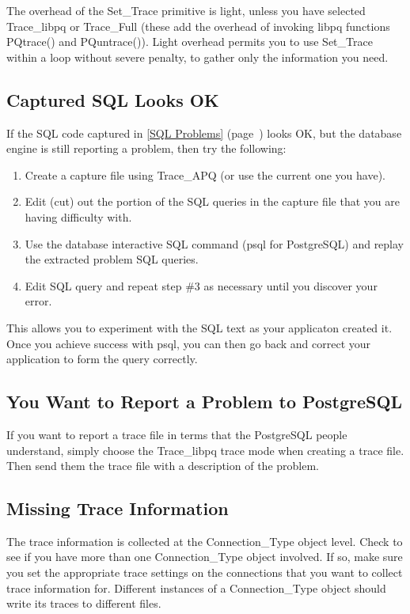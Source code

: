 \documentclass[english,letterpaper]{book}
\newcommand\Ref[1]{\textsection\ref{#1} (page~\pageref{#1})}
\begin{document}
The overhead of the Set\_Trace primitive is light, unless you have
selected Trace\_libpq or Trace\_Full (these add the overhead of invoking
libpq functions PQtrace() and PQuntrace()). Light overhead permits
you to use Set\_Trace within a loop without severe penalty, to gather
only the information you need.


\subsection{Captured SQL Looks OK}

If the SQL code captured in \Ref{SQL Problems} looks OK,
but the database engine is still reporting a problem, then try the
following:

\begin{enumerate}
   \item Create a capture file using Trace\_APQ (or use the current one you
         have).
   \item Edit (cut) out the portion of the SQL queries in the capture file
         that you are having difficulty with.
   \item Use the database interactive SQL command (psql for PostgreSQL) and
         replay the extracted problem SQL queries.
   \item Edit SQL query and repeat step \#3 as necessary until you discover
         your error.
\end{enumerate}

This allows you to experiment with the SQL text as your applicaton
created it. Once you achieve success with psql, you can then go back
and correct your application to form the query correctly.


\subsection{You Want to Report a Problem to PostgreSQL}

If you want to report a trace file in terms that the PostgreSQL people
understand, simply choose the Trace\_libpq trace mode when creating
a trace file. Then send them the trace file with a description of
the problem.


\subsection{Missing Trace Information}

The trace information is collected at the Connection\_Type object
level. Check to see if you have more than one Connection\_Type object
involved. If so, make sure you set the appropriate trace settings
on the connections that you want to collect trace information for.
Different instances of a Connection\_Type object should write its
traces to different files.
\end{document}
